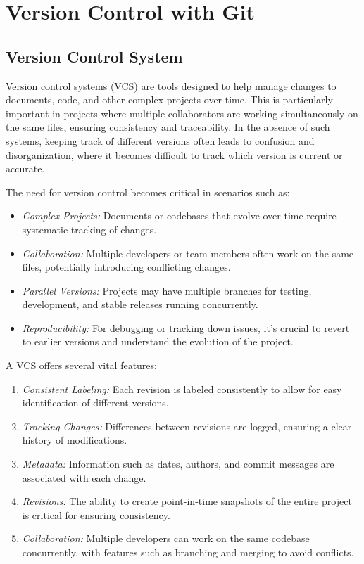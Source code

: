 \chapter{Version Control with Git}
\section{Version Control System}
Version control systems (VCS) are tools designed to help manage changes to documents, code, and other complex projects over time. This is particularly important in projects where multiple collaborators are working simultaneously on the same files, ensuring consistency and traceability. In the absence of such systems, keeping track of different versions often leads to confusion and disorganization, where it becomes difficult to track which version is current or accurate.

The need for version control becomes critical in scenarios such as:
\begin{itemize}
    \item \textit{Complex Projects:} Documents or codebases that evolve over time require systematic tracking of changes.
    \item \textit{Collaboration:} Multiple developers or team members often work on the same files, potentially introducing conflicting changes.
    \item \textit{Parallel Versions:} Projects may have multiple branches for testing, development, and stable releases running concurrently.
    \item \textit{Reproducibility:} For debugging or tracking down issues, it’s crucial to revert to earlier versions and understand the evolution of the project.
\end{itemize}

A VCS offers several vital features:
\begin{enumerate}
    \item \textit{Consistent Labeling:} Each revision is labeled consistently to allow for easy identification of different versions.
    \item \textit{Tracking Changes:} Differences between revisions are logged, ensuring a clear history of modifications.
    \item \textit{Metadata:} Information such as dates, authors, and commit messages are associated with each change.
    \item \textit{Revisions:} The ability to create point-in-time snapshots of the entire project is critical for ensuring consistency.
    \item \textit{Collaboration:} Multiple developers can work on the same codebase concurrently, with features such as branching and merging to avoid conflicts.
\end{enumerate}

